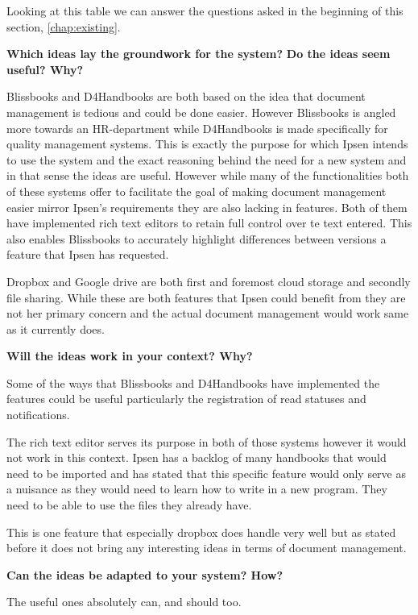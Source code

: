 Looking at this table we can answer the questions asked in the beginning of this section, \cref{chap:existing}.

\textbf{Which ideas lay the groundwork for the system?}
\newline\indent
\textbf{Do the ideas seem useful? Why?}

Blissbooks and D4Handbooks are both based on the idea that document management is tedious and could be done easier.
However Blissbooks is angled more towards an HR-department while D4Handbooks is made specifically for quality management systems.
This is exactly the purpose for which Ipsen intends to use the system and the exact reasoning behind the need for a new system and in that sense the ideas are useful.
However while many of the functionalities both of these systems offer to facilitate the goal of making document management easier mirror Ipsen's requirements they are also lacking in features.
Both of them have implemented rich text editors to retain full control over te text entered. 
This also enables Blissbooks to accurately highlight differences between versions a feature that Ipsen has requested.

Dropbox and Google drive are both first and foremost cloud storage and secondly file sharing. 
While these are both features that Ipsen could benefit from they are not her primary concern and the actual document management would work same as it currently does.

\textbf{Will the ideas work in your context? Why?}

Some of the ways that Blissbooks and D4Handbooks have implemented the features could be useful particularly the registration of read statuses and notifications.

The rich text editor serves its purpose in both of those systems however it would not work in this context.
Ipsen has a backlog of many handbooks that would need to be imported and has stated that this specific feature would only serve as a nuisance as they would need to learn how to write in a new program.
They need to be able to use the files they already have.

This is one feature that especially dropbox does handle very well but as stated before it does not bring any interesting ideas in terms of document management.

\textbf{Can the ideas be adapted to your system? How?}

The useful ones absolutely can, and should too.
